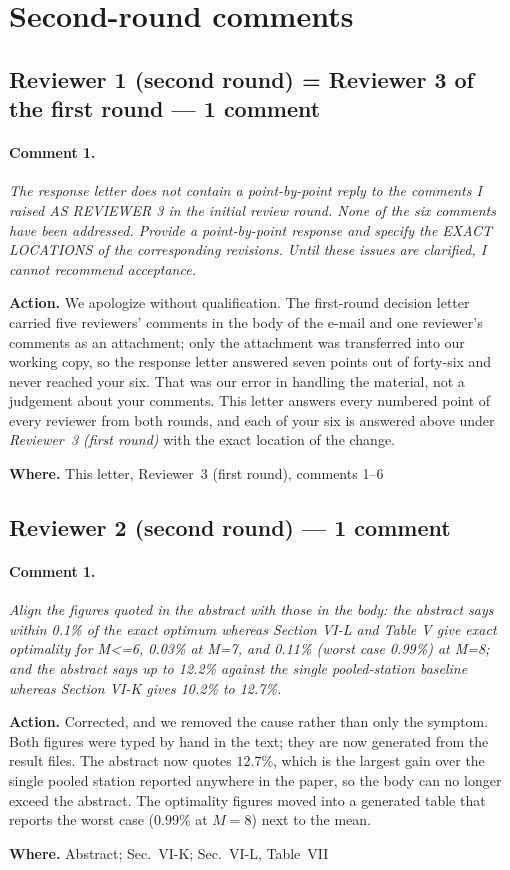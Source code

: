 \documentclass[10pt]{article}
\newcommand{\rev}[1]{\par\medskip\noindent\textit{#1}\par\smallskip}
\newcommand{\act}[2]{\noindent\textbf{Action.} #1\par\noindent\textbf{Where.} #2\par}
\begin{document}
\section*{Second-round comments}

\subsection*{Reviewer 1 (second round) = Reviewer 3 of the first round --- 1 comment}

\paragraph{Comment 1.}
\rev{The response letter does not contain a point-by-point reply to the comments I raised AS REVIEWER 3 in the initial review round. None of the six comments have been addressed. Provide a point-by-point response and specify the EXACT LOCATIONS of the corresponding revisions. Until these issues are clarified, I cannot recommend acceptance.}
\act{We apologize without qualification. The first-round decision letter carried five reviewers' comments in the body of the e-mail and one reviewer's comments as an attachment; only the attachment was transferred into our working copy, so the response letter answered seven points out of forty-six and never reached your six. That was our error in handling the material, not a judgement about your comments. This letter answers every numbered point of every reviewer from both rounds, and each of your six is answered above under \emph{Reviewer~3 (first round)} with the exact location of the change.}{This letter, Reviewer~3 (first round), comments 1--6}

\subsection*{Reviewer 2 (second round) --- 1 comment}

\paragraph{Comment 1.}
\rev{Align the figures quoted in the abstract with those in the body: the abstract says within 0.1\% of the exact optimum whereas Section VI-L and Table V give exact optimality for M<=6, 0.03\% at M=7, and 0.11\% (worst case 0.99\%) at M=8; and the abstract says up to 12.2\% against the single pooled-station baseline whereas Section VI-K gives 10.2\% to 12.7\%.}
\act{Corrected, and we removed the cause rather than only the symptom. Both figures were typed by hand in the text; they are now generated from the result files. The abstract now quotes $12.7\%$, which is the largest gain over the single pooled station reported anywhere in the paper, so the body can no longer exceed the abstract. The optimality figures moved into a generated table that reports the worst case ($0.99\%$ at $M{=}8$) next to the mean.}{Abstract; Sec.~VI-K; Sec.~VI-L, Table~VII}
\end{document}
